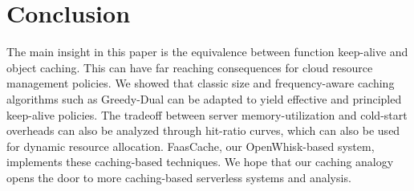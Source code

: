 \section{Conclusion}

The main insight in this paper is the equivalence between function keep-alive and object caching.
This can have far reaching consequences for cloud resource management policies.
We showed that classic size and frequency-aware caching algorithms such as Greedy-Dual can be adapted to yield effective and principled keep-alive policies.
The tradeoff between server memory-utilization and cold-start overheads can also be analyzed through hit-ratio curves, which can also be used for dynamic resource allocation.
FaasCache, our OpenWhisk-based system, implements these caching-based techniques.
We hope that our caching analogy opens the door to more caching-based serverless systems and analysis. 



